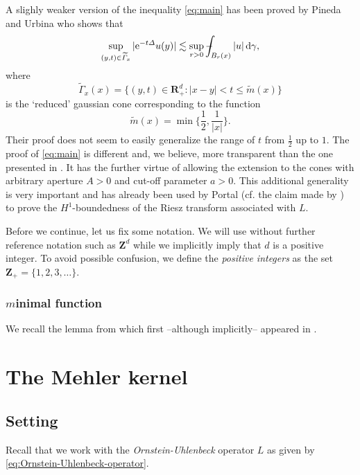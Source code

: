 \documentclass[a4paper,oneside,10pt]{amsproc}
\theoremstyle{remark}
\newcommand{\D}{\,\textup{d}}
\def\Xint#1{\mathchoice
  {\XXint\displaystyle\textstyle{#1}}%
  {\XXint\textstyle\scriptstyle{#1}}%
  {\XXint\scriptstyle\scriptscriptstyle{#1}}%
  {\XXint\scriptscriptstyle\scriptscriptstyle{#1}}%
  \!\int}
\def\XXint#1#2#3{{\setbox0=\hbox{$#1{#2#3}{\int}$ }
    \vcenter{\hbox{$#2#3$ }}\kern-.535\wd0}}
\def\dashint{\Xint-}
\renewcommand{\leq}{\leqslant}
\renewcommand{\leq}{\leqslant}
\newcommand{\R}{\mathbf R}
\newcommand{\Z}{\mathbf Z}
\newcommand{\e}{\mathrm{e}} %
\renewcommand{\leq}{\leqslant}%
\begin{document}
A slighly weaker version of the inequality \eqref{eq:main} has been proved by 
Pineda and Urbina \cite{Pineda2008} who 
shows that 
\begin{equation*}
  \sup_{(y, t) \in \widetilde{\Gamma}_x} |\e^{-t \Delta} u(y)|
  \lesssim \sup_{r > 0}  \dashint_{B_r(x)} |u| \D\gamma,
\end{equation*}
where
\begin{equation*}
  \widetilde{\Gamma}_x(x) = \{(y, t) \in \R^d_+ : |x - y| < t \leq
  \widetilde{m}(x)\}
\end{equation*}
is the `reduced' gaussian cone corresponding to the function
\begin{equation*}
  \widetilde{m}(x) = \min\biggl\{\frac12, \frac1{|x|}\biggr\}.
\end{equation*}
Their proof does not seem to easily generalize the range of $t$ from $\frac12$ up
to $1$. The proof of \eqref{eq:main} is different and, we believe, more transparent 
than the one presented in \cite{Pineda2008}. It has the further virtue of allowing 
the extension to the cones
with arbitrary aperture $A>0$ and cut-off parameter $a>0$. This additional generality
is very important and has already been used by Portal (cf. 
the claim made by \cite[discussion preceding Lemma 2.3]{Portal2012}) to prove the 
$H^1$-boundedness of the Riesz transform associated with $L$.

Before we continue, let us fix some notation. We will use without
further reference notation such as $\Z^d$ while we implicitly imply
that $d$ is a positive integer. To avoid possible confusion, we define
the \emph{positive integers} as the set $\Z_+ = \{1, 2, 3, \dots\}$. 


% 
% 
% 

\subsubsection{$m$inimal function}
We recall the lemma from \cite[lemma 2.3]{Maas2011} which first
--although implicitly-- appeared in \cite{Mauceri2007}.

\section{The Mehler kernel}
\subsection{Setting}
Recall that we work with the \emph{Ornstein-Uhlenbeck} operator $L$ as
given by \eqref{eq:Ornstein-Uhlenbeck-operator}.
\end{document}
